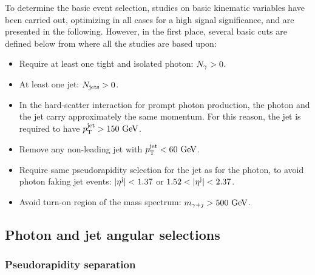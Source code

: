 To determine the basic event selection, studies on basic kinematic variables have been carried out, optimizing in all cases for a high signal significance, and are presented in the following.
However, in the first place, several basic cuts are defined below from where all the studies are based upon:
\begin{itemize}
    \item Require at least one tight and isolated photon: \(N_{\gamma} > 0\).
    \item At least one jet: \(N_{\text{jets}} > 0\).
    \item In the hard-scatter interaction for prompt photon production, the photon and the jet carry approximately the same momentum. For this reason, the jet is required to have \(p_{\text{T}}^\text{jet} > 150~\text{GeV}\).
    \item Remove any non-leading jet with \(p_{\text{T}}^\text{jet} < 60~\text{GeV}\).
    \item Require same pseudorapidity selection for the jet as for the photon, to avoid photon faking jet events: \(|\eta^{\text{j}}| < 1.37\) or \(1.52 < |\eta^{\text{j}}| < 2.37\).
    \item Avoid turn-on region of the mass spectrum: \(m_{\gamma+j} > 500~\text{GeV}\).
\end{itemize}



\subsection{Photon and jet angular selections}
\label{subsec:evt_selection:sr_opt:eta}



\subsubsection{Pseudorapidity separation}
\label{subsubsec:evt_selection:sr_opt:eta:deta}


